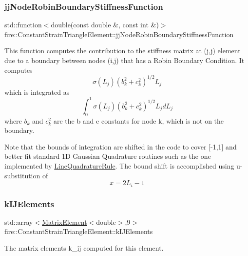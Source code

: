 \subsubsection{\texorpdfstring{jj\+Node\+Robin\+Boundary\+Stiffness\+Function}{jjNodeRobinBoundaryStiffnessFunction}}
{\footnotesize\ttfamily std\+::function$<$double(const double \&, const int \&)$>$ fire\+::\+Constant\+Strain\+Triangle\+Element\+::jj\+Node\+Robin\+Boundary\+Stiffness\+Function\hspace{0.3cm}{\ttfamily [protected]}}

This function computes the contribution to the stiffness matrix at (j,j) element due to a boundary between nodes (i,j) that has a Robin Boundary Condition. It computes \[ \sigma(L_{j})(b_{k}^2 + c_{k}^2)^{1/2}L_{j} \] which is integrated as \[ \int_{0}^{1} \sigma(L_{j})(b_{k}^2 + c_{k}^2)^{1/2}L_{j} dL_{j} \] where $b_{k}$ and $c_{k}^2$ are the b and c constants for node k, which is not on the boundary.

Note that the bounds of integration are shifted in the code to cover \mbox{[}-\/1,1\mbox{]} and better fit standard 1D Gaussian Quadrature routines such as the one implemented by \hyperlink{a00885}{Line\+Quadrature\+Rule}. The bound shift is accomplished using u-\/substitution of \[ x = 2L_{i} - 1 \] \mbox{\label{a00789_a9126763a046ac0736d72b6b5d20ba80d}} 
\subsubsection{\texorpdfstring{k\+I\+J\+Elements}{kIJElements}}
{\footnotesize\ttfamily std\+::array$<$\hyperlink{a00210_a1a12603621e7a1efa59ac5cb79f9d509}{Matrix\+Element}$<$double$>$,9$>$ fire\+::\+Constant\+Strain\+Triangle\+Element\+::k\+I\+J\+Elements\hspace{0.3cm}{\ttfamily [protected]}}

The matrix elements k\+\_\+ij computed for this element. \mbox{\label{a00789_ad20a70ab85fd002e3bfe41b5a8912405}} 
